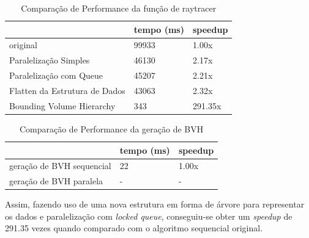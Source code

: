 \documentclass[a4paper]{report}
\begin{document}
\begin{table}[h]
    \centering
    \begin{tabular}{|l|l|l|}
        \hline
                                      & tempo (ms) & speedup \\ \hline
        original                      & 99933      & 1.00x \\ \hline
        Paralelização Simples         & 46130      & 2.17x \\ \hline
        Paralelização com Queue       & 45207      & 2.21x \\ \hline
        Flatten da Estrutura de Dados & 43063      & 2.32x \\ \hline
        Bounding Volume Hierarchy     & 343        & 291.35x \\ \hline
    \end{tabular}
    \caption{Comparação de Performance da função de raytracer}
\end{table}

\begin{table}[h]
    \centering
    \begin{tabular}{|l|l|l|}
        \hline
                                  & tempo (ms) & speedup \\ \hline
        geração de BVH sequencial & 22     & 1.00x \\ \hline
        geração de BVH paralela   & -       & - \\ \hline
    \end{tabular}
    \caption{Comparação de Performance da geração de BVH}
\end{table}

Assim, fazendo uso de uma nova estrutura em forma de árvore para representar os
dados e paralelização com \textit{locked queue},  conseguiu-se obter um
\textit{speedup} de 291.35 vezes quando comparado com o algoritmo sequencial
original.
\end{document}
